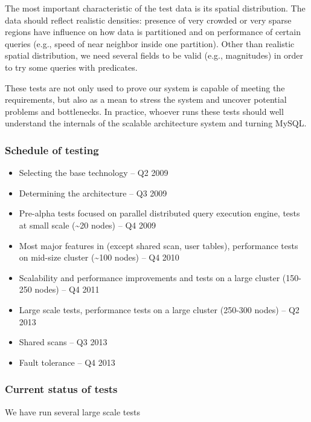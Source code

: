 \documentclass[DM,lsstdraft,toc]{lsstdoc}
\begin{document}
The most important characteristic of the test data is its spatial
distribution. The data should reflect realistic densities: presence of
very crowded or very sparse regions have influence on how data is
partitioned and on performance of certain queries (e.g., speed of near
neighbor inside one partition). Other than realistic spatial
distribution, we need several fields to be valid (e.g., magnitudes) in
order to try some queries with predicates.

These tests are not only used to prove our system is capable of meeting
the requirements, but also as a mean to stress the system and uncover
potential problems and bottlenecks. In practice, whoever runs these
tests should well understand the internals of the scalable architecture
system and turning MySQL.

\subsubsection{Schedule of testing}\label{schedule-of-testing}

\begin{itemize}
\item
  Selecting the base technology -- Q2 2009
\item
  Determining the architecture -- Q3 2009
\item
  Pre-alpha tests focused on parallel distributed query execution
  engine, tests at small scale (\textasciitilde{}20 nodes) -- Q4 2009
\item
  Most major features in (except shared scan, user tables), performance
  tests on mid-size cluster (\textasciitilde{}100 nodes) -- Q4 2010
\item
  Scalability and performance improvements and tests on a large cluster
  (150-250 nodes) -- Q4 2011
\item
  Large scale tests, performance tests on a large cluster (250-300
  nodes) -- Q2 2013
\item
  Shared scans -- Q3 2013
\item
  Fault tolerance -- Q4 2013
\end{itemize}

\subsubsection{Current status of tests}\label{current-status-of-tests}

We have run several large scale tests
\end{document}
